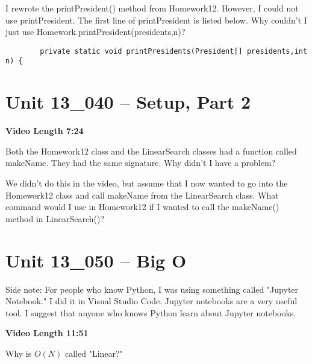 \documentclass[letterpaper,12pt]{exam}
\newcommand{\unit}{Unit 13}
\begin{document}
\begin{questions}
\begin{samepage}
    \question I rewrote the printPresident() method from Homework12.  However, I could not use printPresident.  The first line of printPresident is listed below.  Why couldn't I just use Homework.printPresident(presidents,n)?
    \begin{verbatim}
        private static void printPresidents(President[] presidents,int n) {
    \end{verbatim}
    \vspace{5mm}
\end{samepage}

\section*{\unit\_040 -- Setup, Part 2} 
\par{\selectfont\textbf{Video Length 7:24}}

\begin{samepage}
    \question Both the Homework12 class and the LinearSearch classes had a function called makeName.  They had the same signature. Why didn't I have a problem? 
    \vspace{5mm}
\end{samepage}
\begin{samepage}
    \question We didn't do this in the video, but assume that I now wanted to go into the Homework12 class and call makeName from the LinearSearch class.  What command would I use in Homework12 if I wanted to call the makeName() method in LinearSearch()?
    \vspace{5mm}
\end{samepage}

\section*{\unit\_050 -- Big O} 

Side note:  For people who know Python, I was using something called "Jupyter Notebook."  I did it in Visual Studio Code.  Jupyter notebooks are a very useful tool.  I suggest that anyone who knows Python learn about Jupyter notebooks.

\par{\selectfont\textbf{Video Length 11:51}}
\begin{samepage}
    \question Why is $O(N)$ called "Linear?"
    \vspace{5mm}
\end{samepage}


\end{questions}
\end{document}
